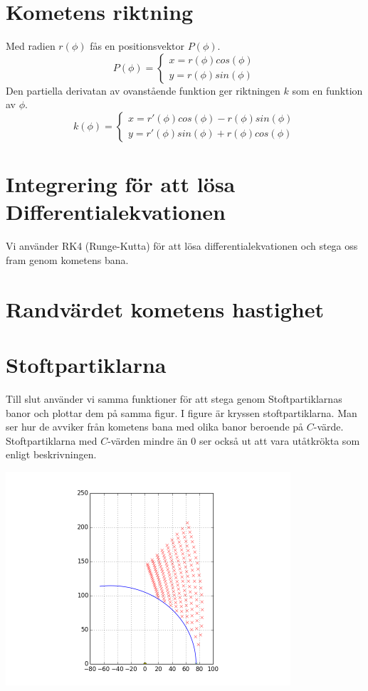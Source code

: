 \documentclass[11pt,twoside]{article}
\begin{document}
\section{Kometens riktning}	
Med radien $r(\phi)$ fås en positionsvektor $P(\phi)$.
\begin{equation}
	P(\phi) = \begin{cases}
	x = r(\phi) cos(\phi) \\
	y = r(\phi) sin(\phi)
	\end{cases}
\end{equation}
Den partiella derivatan av ovanstående funktion ger riktningen $k$ som en funktion av $\phi$. 
\begin{equation}
	k(\phi) = \begin{cases}
	x = r'(\phi) cos(\phi) - r(\phi) sin(\phi) \\
	y = r'(\phi) sin(\phi) + r(\phi) cos(\phi)
	\end{cases}
\end{equation}

\section{Integrering för att lösa Differentialekvationen}
Vi använder RK4 (Runge-Kutta) för att lösa differentialekvationen och stega oss fram genom kometens bana.


\section{Randvärdet kometens hastighet}


\section{Stoftpartiklarna}

Till slut använder vi samma funktioner för att stega genom Stoftpartiklarnas banor och plottar dem på samma figur.
I figure är kryssen stoftpartiklarna. Man ser hur de avviker från kometens bana med olika banor beroende på $C$-värde. Stoftpartiklarna med $C$-värden mindre än 0 ser också
ut att vara utåtkrökta som enligt beskrivningen.

\includegraphics[width=300pt]{imgs/svans.png}
\end{document}
